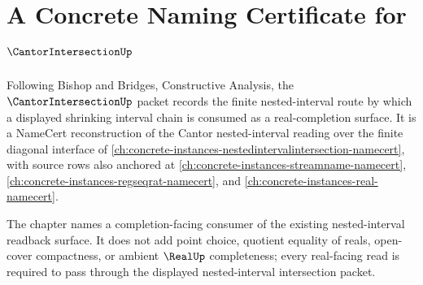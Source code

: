 \chapter{A Concrete Naming Certificate for $\CantorIntersectionUp$}
\label{ch:concrete-instances-cantor-intersection-namecert}

Following Bishop and Bridges, Constructive Analysis, the $\CantorIntersectionUp$ packet records the finite nested-interval route by which a displayed shrinking interval chain is consumed as a real-completion surface. It is a NameCert reconstruction of the Cantor nested-interval reading over the finite diagonal interface of \autoref{ch:concrete-instances-nestedintervalintersection-namecert}, with source rows also anchored at \autoref{ch:concrete-instances-streamname-namecert}, \autoref{ch:concrete-instances-regseqrat-namecert}, and \autoref{ch:concrete-instances-real-namecert}.

The chapter names a completion-facing consumer of the existing nested-interval readback surface. It does not add point choice, quotient equality of reals, open-cover compactness, or ambient $\RealUp$ completeness; every real-facing read is required to pass through the displayed nested-interval intersection packet.

